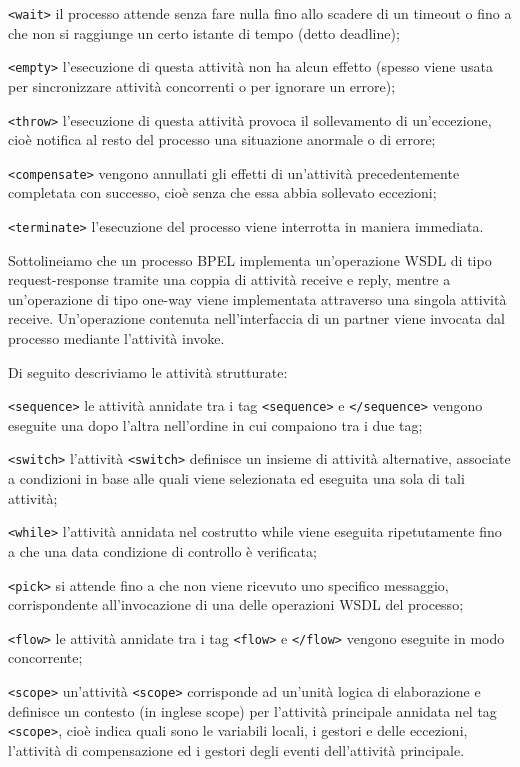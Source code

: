 \texttt{<wait>} il processo attende senza fare nulla fino allo scadere di un
timeout o fino a che non si raggiunge un certo istante di tempo (detto deadline);
     
\texttt{<empty>} l'esecuzione di questa attività non ha alcun effetto (spesso
viene usata per sincronizzare attività concorrenti o per ignorare un errore);
                                     
\texttt{<throw>} l’esecuzione di questa attività provoca il sollevamento di
un'eccezione, cioè notifica al resto del processo una situazione anormale o di
errore;

\texttt{<compensate>} vengono annullati gli effetti di un'attività
precedentemente completata con successo, cioè senza che essa abbia sollevato eccezioni;

\texttt{<terminate>} l'esecuzione del processo viene interrotta in maniera
immediata.

Sottolineiamo che un processo BPEL implementa un'operazione WSDL di tipo 
request-response tramite una coppia di attività receive e reply, mentre a
un'operazione di tipo one-way viene implementata attraverso una singola
attività receive. Un'operazione contenuta nell'interfaccia di un partner viene
invocata dal processo mediante l'attività invoke.

Di seguito descriviamo le attività strutturate:

\texttt{<sequence>} le attività annidate tra i tag \texttt{<sequence>} e
\texttt{</sequence>} vengono eseguite  una dopo l'altra nell'ordine in cui
compaiono tra i due tag;

\texttt{<switch>} l'attività \texttt{<switch>} definisce un insieme di attività
alternative, associate a condizioni in base alle quali viene selezionata ed eseguita
una sola di tali attività;

\texttt{<while>} l’attività annidata nel costrutto while viene eseguita
ripetutamente fino a che una data condizione di controllo è verificata;                             

\texttt{<pick>} si attende fino a che non viene ricevuto uno specifico
messaggio, corrispondente all'invocazione di una delle operazioni WSDL del processo;

\texttt{<flow>} le attività annidate tra i tag \texttt{<flow>} e
\texttt{</flow>} vengono eseguite in modo concorrente;

\texttt{<scope>} un'attività \texttt{<scope>} corrisponde ad un'unità logica di
elaborazione e definisce un contesto (in inglese scope) per l'attività principale
annidata nel tag \texttt{<scope>}, cioè indica quali sono le variabili locali, i
gestori e delle eccezioni, l'attività di compensazione ed i gestori degli eventi
dell'attività principale.

